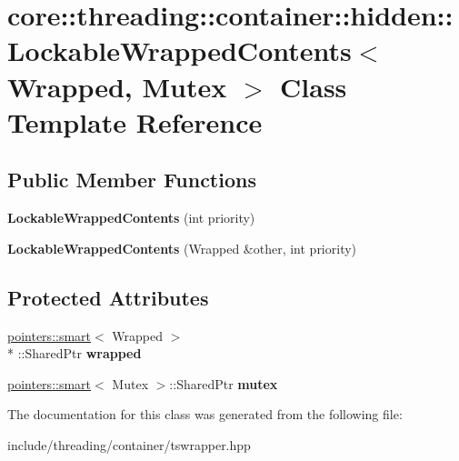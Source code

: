 \hypertarget{classcore_1_1threading_1_1container_1_1hidden_1_1_lockable_wrapped_contents}{\section{core\-:\-:threading\-:\-:container\-:\-:hidden\-:\-:Lockable\-Wrapped\-Contents$<$ Wrapped, Mutex $>$ Class Template Reference}
\label{classcore_1_1threading_1_1container_1_1hidden_1_1_lockable_wrapped_contents}
}
\subsection*{Public Member Functions}
\begin{DoxyCompactItemize}
\item 
\hypertarget{classcore_1_1threading_1_1container_1_1hidden_1_1_lockable_wrapped_contents_a87734fe52452054cd2a5ec5db6ea8af9}{{\bfseries Lockable\-Wrapped\-Contents} (int priority)}\label{classcore_1_1threading_1_1container_1_1hidden_1_1_lockable_wrapped_contents_a87734fe52452054cd2a5ec5db6ea8af9}

\item 
\hypertarget{classcore_1_1threading_1_1container_1_1hidden_1_1_lockable_wrapped_contents_af4eb15d10c97412ac2edd98bb85c7b92}{{\bfseries Lockable\-Wrapped\-Contents} (Wrapped \&other, int priority)}\label{classcore_1_1threading_1_1container_1_1hidden_1_1_lockable_wrapped_contents_af4eb15d10c97412ac2edd98bb85c7b92}

\end{DoxyCompactItemize}
\subsection*{Protected Attributes}
\begin{DoxyCompactItemize}
\item 
\hypertarget{classcore_1_1threading_1_1container_1_1hidden_1_1_lockable_wrapped_contents_a08d4962581960a505bba42c01721d117}{\hyperlink{structcore_1_1pointers_1_1smart}{pointers\-::smart}$<$ Wrapped $>$\\*
\-::Shared\-Ptr {\bfseries wrapped}}\label{classcore_1_1threading_1_1container_1_1hidden_1_1_lockable_wrapped_contents_a08d4962581960a505bba42c01721d117}

\item 
\hypertarget{classcore_1_1threading_1_1container_1_1hidden_1_1_lockable_wrapped_contents_a8c38646bb474ab4ed9764814c60a2ce1}{\hyperlink{structcore_1_1pointers_1_1smart}{pointers\-::smart}$<$ Mutex $>$\-::Shared\-Ptr {\bfseries mutex}}\label{classcore_1_1threading_1_1container_1_1hidden_1_1_lockable_wrapped_contents_a8c38646bb474ab4ed9764814c60a2ce1}

\end{DoxyCompactItemize}


The documentation for this class was generated from the following file\-:\begin{DoxyCompactItemize}
\item 
include/threading/container/tswrapper.\-hpp\end{DoxyCompactItemize}
